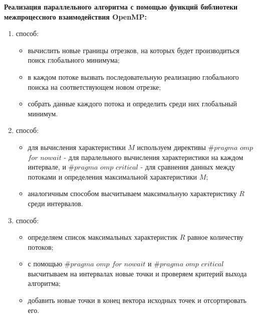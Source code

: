 \documentclass{report}
\begin{document}
\textbf{Реализация параллельного алгоритма с помощью функций библиотеки межпроцессного взаимодействия OpenMP:}
\begin{enumerate}
    \item способ:
        \begin{itemize}
            \item вычислить новые границы отрезков, на которых будет производиться поиск глобального минимума;
            \item в каждом потоке вызвать последовательную реализацию глобального поиска на соответствующем новом отрезке;
            \item собрать данные каждого потока и определить среди них глобальный минимум.
        \end{itemize}
   \item способ:
        \begin{itemize}
            \item для вычисления характеристики $M$ используем директивы $\#pragma$ $omp$ $for$ $nowait$ - для паралельного вычисления характеристики на каждом интервале, и $\#pragma$ $omp$ $critical$ - для сравнения данных между потоками и определения максимальной характеристики $M$;
            \item аналогичным способом высчитываем максимальную характеристику $R$ среди интервалов.
        \end{itemize}
    \item способ:
        \begin{itemize}
            \item определяем список максимальных характеристик $R$ равное количеству потоков;
            \item с помощью $\#pragma$ $omp$ $for$ $nowait$ и $\#pragma$ $omp$ $critical$ высчитываем на интервалах новые точки и проверяем критерий выхода алгоритма;
            \item добавить новые точки в конец вектора исходных точек и отсортировать его.
        \end{itemize}
\end{enumerate}
\end{document}
